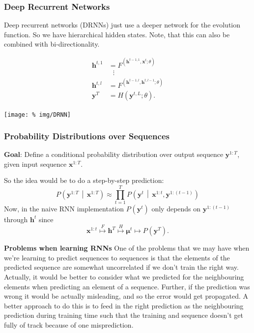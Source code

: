 \documentclass[a2paper,4pt]{extarticle}
\newcommand{\Prob}[2][]{P_{#1}\left( #2 \right)}
\newcommand{\cProb}[3][]{P_{#1}\left( #2 \,\middle|\, #3 \right)}
\renewcommand{\vec}[1]{\mathbf{#1}}
\newcommand{\vh}{\vec{h}}
\newcommand{\vx}{\vec{x}}
\newcommand{\vy}{\vec{y}}
\newcommand{\vmu}{\boldsymbol{\mu}}
\begin{document}
\begin{landscape}
\begin{multicols*}{7}
\subsubsection{Deep Recurrent Networks}

Deep recurrent networks (DRNNs) just use a deeper network for the evolution
function. So we have hierarchical hidden states. Note, that this can also be
combined with bi-directionality.

\begin{multicols}{2}
\begin{align*}
\vh^{t,1}&=F^(\vh^{t-1,1},\vx^t;\theta)\\
&\,\,\,\,\vdots\\
\vh^{t,l}&=F^(\vh^{t-1,l},\vh^{t,l-1};\theta)\\
\vy^T&=H(\vy^{t,L};\theta).
\end{align*}
\begin{center}
  \texttt{[image: \%
img/DRNN]}
\end{center}
\end{multicols}





\subsubsection{Probability Distributions over Sequences}

\textbf{Goal}: Define a conditional probability distribution over output
sequence $\vy^{1:T}$, given input sequence $\vx^{1:T}$.

So the idea would be to do a step-by-step prediction:
\[
\cProb{\vy^{1:T}}{\vx^{1:T}}
\approx
\prod_{t=1}^T
\cProb{\vy^t}{\vx^{1:t},\vy^{1:(t-1)}}
\]
Now, in the naive RNN implementation $\Prob{\vy^t}$ only depends on
$\vy^{1:(t-1)}$ through $\vh^t$ since
\[
\vx^{1:t}
\stackrel{F}{\mapsto}
\vh^T
\stackrel{H}{\mapsto}
\vmu^t
\mapsto
\Prob{\vy^T}.
\]

\textbf{Problems when learning RNNs} One of the problems that we may have when
we're learning to predict sequences to sequences is that the elements of the
predicted sequence are somewhat uncorrelated if we don't train the right way.
Actually, it would be better to consider what we predicted for the neighbouring
elements when predicting an element of a sequence. Further, if the prediction
was wrong it would be actually misleading, and so the error would get
propagated. A better approach to do this is to feed in the right prediction as
the neighbouring prediction during training time such that the training and
sequence doesn't get fully of track because of one misprediction.


\end{multicols*}
\end{landscape}
\end{document}
